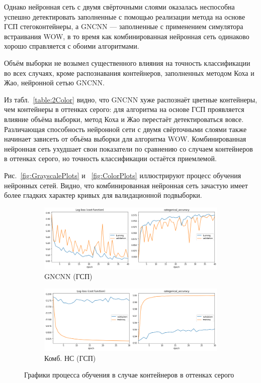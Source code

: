 Однако нейронная сеть с двумя свёрточными слоями оказалась неспособна успешно детектировать заполненные с помощью реализации метода на основе ГСП стегоконтейнеры, а GNCNN --- заполненные с применением симулятора встраивания WOW, в то время как комбинированная нейронная сеть одинаково хорошо справляется с обоими алгоритмами.

Объём выборки не возымел существенного влияния на точность классификации во всех случаях, кроме распознавания контейнеров, заполненных методом Коха и Жао, нейронной сетью GNCNN.

Из табл.~\ref{table:2Color} видно, что GNCNN хуже распознаёт цветные контейнеры, чем контейнеры в оттенках серого: для алгоритма на основе ГСП проявляется влияние объёма выборки, метод Коха и Жао перестаёт детектироваться вовсе. Различающая способность нейронной сети с двумя свёрточными слоями также начинает зависеть от объёма выборки для алгоритма WOW. Комбинированная нейронная сеть ухудшает свои показатели по сравнению со случаем контейнеров в оттенках серого, но точность классификации остаётся приемлемой.

Рис.~\ref{fig:GrayscalePlots} и ~\ref{fig:ColorPlots} иллюстрируют процесс обучения нейронных сетей. Видно, что комбинированная нейронная сеть зачастую имеет более гладких характер кривых для валидационной подвыборки.

\begin{figure}[p]
    \centering

    \begin{subfigure}{\textwidth}
        \includegraphics[width=\textwidth]{include/graphics/experimental_plots/grayscale/gncnn_hic}
                    \caption{GNCNN (ГСП)}
    \end{subfigure}

    \begin{subfigure}{\textwidth}
        \includegraphics[width=\textwidth]{include/graphics/experimental_plots/grayscale/mixed_hic}
                    \caption{Комб. НС (ГСП)}
    \end{subfigure}

   \caption{Графики процесса обучения в случае контейнеров в оттенках серого}
    \label{fig:GrayscalePlotsHIC}
\end{figure}

